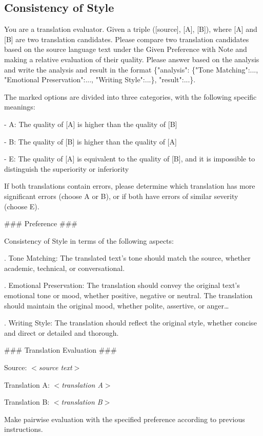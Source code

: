\documentclass{article}
\theoremstyle{plain}
\theoremstyle{definition}
\theoremstyle{remark}
\begin{document}
\subsection{Consistency of Style}
\begin{tcolorbox}[colback=gray!10, colframe=gray!80, width=\textwidth,title=Prompt: Consistency of Style, breakable]
You are a translation evaluator. Given a triple ([source], [A], [B]), where [A] and [B] are two translation candidates. Please compare two translation candidates based on the source language text under the Given Preference with Note and making a relative evaluation of their quality. Please answer based on the analysis and write the analysis and result in the format \{"analysis": \{"Tone Matching":..., "Emotional Preservation":..., "Writing Style":...\}, "result":...\}.

The marked options are divided into three categories, with the following specific meanings:

\quad  - A: The quality of [A] is higher than the quality of [B]

\quad  - B: The quality of [B] is higher than the quality of [A]

\quad  - E: The quality of [A] is equivalent to the quality of [B], and it is impossible to distinguish the superiority or inferiority

If both translations contain errors, please determine which translation has more significant errors (choose A or B), or if both have errors of similar severity (choose E).

\text{}

\#\#\# Preference \#\#\#

Consistency of Style in terms of the following aspects:

. Tone Matching: The translated text’s tone should match the source, whether academic, technical, or conversational.

. Emotional Preservation: The translation should convey the original text's emotional tone or mood, whether positive, negative or neutral. The translation should maintain the original mood, whether polite, assertive, or anger…

. Writing Style: The translation should reflect the original style, whether concise and direct or detailed and thorough.

\text{}

\#\#\# Translation Evaluation \#\#\#

Source: \textit{$<$source text$>$}

Translation A: \textit{$<$translation A$>$}

Translation B: \textit{$<$translation B$>$}


Make pairwise evaluation with the specified preference according to previous instructions.
\end{tcolorbox}
\end{document}

